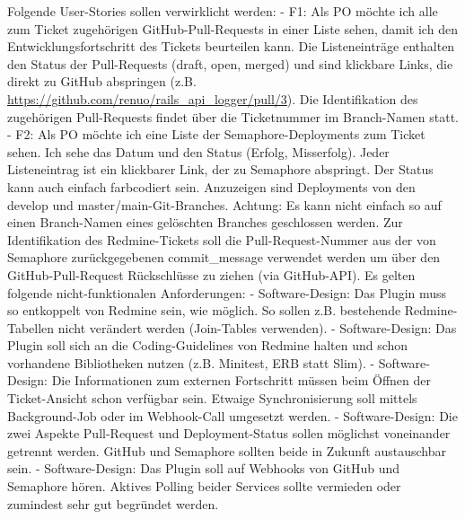 Folgende User-Stories sollen verwirklicht werden: \newline
- F1: Als PO möchte ich alle zum Ticket zugehörigen GitHub-Pull-Requests in einer Liste sehen, damit ich den Entwicklungsfortschritt des Tickets beurteilen kann. Die Listeneinträge enthalten den Status der Pull-Requests (draft, open, merged) und sind klickbare Links, die direkt zu GitHub abspringen (z.B. \url{https://github.com/renuo/rails\_api\_logger/pull/3}). Die Identifikation des zugehörigen Pull-Requests findet über die Ticketnummer im Branch-Namen statt. \newline
- F2: Als PO möchte ich eine Liste der Semaphore-Deployments zum Ticket sehen. Ich sehe das Datum und den Status (Erfolg, Misserfolg). Jeder Listeneintrag ist ein klickbarer Link, der zu Semaphore abspringt. Der Status kann auch einfach farbcodiert sein. \newline
Anzuzeigen sind Deployments von den develop und master/main-Git-Branches. \newline
Achtung: Es kann nicht einfach so auf einen Branch-Namen eines gelöschten Branches geschlossen werden. Zur Identifikation des Redmine-Tickets soll die Pull-Request-Nummer aus der von Semaphore zurückgegebenen commit\_message verwendet werden um über den GitHub-Pull-Request Rückschlüsse zu ziehen (via GitHub-API). \newline
Es gelten folgende nicht-funktionalen Anforderungen: \newline
- Software-Design: Das Plugin muss so entkoppelt von Redmine sein, wie möglich. So sollen z.B. bestehende Redmine-Tabellen nicht verändert werden (Join-Tables verwenden). \newline
- Software-Design: Das Plugin soll sich an die Coding-Guidelines von Redmine halten und schon vorhandene Bibliotheken nutzen (z.B. Minitest, ERB statt Slim). \newline
- Software-Design: Die Informationen zum externen Fortschritt müssen beim Öffnen der Ticket-Ansicht schon verfügbar sein. Etwaige Synchronisierung soll mittels Background-Job oder im Webhook-Call umgesetzt werden. \newline
- Software-Design: Die zwei Aspekte Pull-Request und Deployment-Status sollen möglichst voneinander getrennt werden. GitHub und Semaphore sollten beide in Zukunft austauschbar sein. \newline
- Software-Design: Das Plugin soll auf Webhooks von GitHub und Semaphore hören. Aktives Polling beider Services sollte vermieden oder zumindest sehr gut begründet werden. \newline
